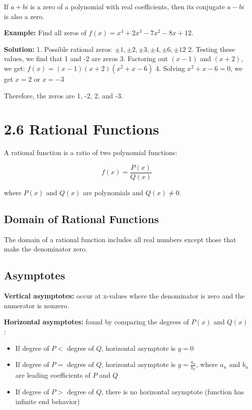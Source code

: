\documentclass[12pt]{article}
\begin{document}
If $a + bi$ is a zero of a polynomial with real coefficients, then its conjugate $a - bi$ is also a zero.

\textbf{Example:} Find all zeros of $f(x) = x^4 + 2x^3 - 7x^2 - 8x + 12$.

\textbf{Solution:}
1. Possible rational zeros: $\pm 1, \pm 2, \pm 3, \pm 4, \pm 6, \pm 12$
2. Testing these values, we find that 1 and -2 are zeros
3. Factoring out $(x - 1)$ and $(x + 2)$, we get:
   $f(x) = (x - 1)(x + 2)(x^2 + x - 6)$
4. Solving $x^2 + x - 6 = 0$, we get $x = 2$ or $x = -3$

Therefore, the zeros are 1, -2, 2, and -3.

\section{2.6 Rational Functions}

A rational function is a ratio of two polynomial functions:

\[f(x) = \frac{P(x)}{Q(x)}\]

where $P(x)$ and $Q(x)$ are polynomials and $Q(x) \neq 0$.

\subsection{Domain of Rational Functions}

The domain of a rational function includes all real numbers except those that make the denominator zero.

\subsection{Asymptotes}

\textbf{Vertical asymptotes:} occur at x-values where the denominator is zero and the numerator is nonzero.

\textbf{Horizontal asymptotes:} found by comparing the degrees of $P(x)$ and $Q(x)$:
\begin{itemize}
    \item If degree of $P < $ degree of $Q$, horizontal asymptote is $y = 0$
    \item If degree of $P = $ degree of $Q$, horizontal asymptote is $y = \frac{a_n}{b_n}$, where $a_n$ and $b_n$ are leading coefficients of $P$ and $Q$
    \item If degree of $P > $ degree of $Q$, there is no horizontal asymptote (function has infinite end behavior)
\end{itemize}
\end{document}
